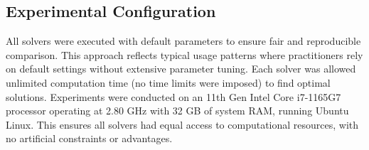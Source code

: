 \subsection{Experimental Configuration}
All solvers were executed with default parameters to ensure fair and reproducible comparison. This approach reflects typical usage patterns where practitioners rely on default settings without extensive parameter tuning. Each solver was allowed unlimited computation time (no time limits were imposed) to find optimal solutions. Experiments were conducted on an 11th Gen Intel Core i7-1165G7 processor operating at 2.80 GHz with 32 GB of system RAM, running Ubuntu Linux. This ensures all solvers had equal access to computational resources, with no artificial constraints or advantages.
